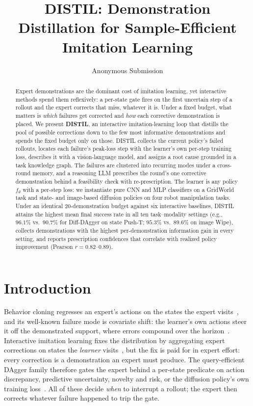 \documentclass[letterpaper]{article} %
\title{DISTIL: Demonstration Distillation for Sample-Efficient Imitation Learning}
\author{
    Anonymous Submission
}
\begin{document}
\maketitle

\begin{abstract}
Expert demonstrations are the dominant cost of imitation learning, yet
interactive methods spend them reflexively: a per-state gate fires on the first
uncertain step of a rollout and the expert corrects that miss, whatever it is.
Under a fixed budget, what matters is \emph{which} failures get corrected and
\emph{how} each corrective demonstration is placed.
We present \textbf{DISTIL}, an interactive imitation-learning loop that
distills the pool of possible corrections down to the few most informative
demonstrations and spends the fixed budget only on those.
DISTIL collects the current policy's failed rollouts, locates each failure's
peak-loss step with the learner's own per-step training loss, describes it
with a vision-language model, and assigns a root cause grounded in a task
knowledge graph. The failures are clustered into recurring modes under a
cross-round memory, and a reasoning LLM prescribes the round's one
corrective demonstration behind a feasibility check with re-prescription.
The learner is any policy
$f_\theta$ with a per-step loss: we instantiate pure CNN and MLP classifiers on
a GridWorld task and state- and image-based diffusion policies on four robot
manipulation tasks. Under an identical 20-demonstration budget against six
interactive baselines, DISTIL attains the highest mean final success rate in
all ten task--modality settings (e.g., $96.1\%$ vs.\ $90.7\%$ for Diff-DAgger on
state Push-T; $95.3\%$ vs.\ $89.6\%$ on image Wipe), collects demonstrations
with the highest per-demonstration information gain in every setting, and
reports prescription confidences that correlate with realized policy
improvement (Pearson $r=0.82$--$0.89$).
\end{abstract}

\section{Introduction}

Behavior cloning regresses an expert's actions on the states the expert
visits~\citep{pomerleau1988alvinn}, and its well-known
failure mode is covariate shift: the learner's own actions steer it off the
demonstrated support, where errors compound over the
horizon~\citep{ross2011dagger}. Interactive imitation learning fixes the
distribution by aggregating expert corrections on states the \emph{learner}
visits~\citep{ross2011dagger,celemin2022iil}, but the fix is paid for in
expert effort: every correction is a demonstration an expert must produce.
The query-efficient DAgger family therefore gates the expert behind a
per-state predicate on action discrepancy, predictive uncertainty, novelty
and risk, or the diffusion policy's own training
loss~\citep{zhang2017safedagger,menda2017dropoutdagger,menda2019ensembledagger,hoque2021thriftydagger,lee2025diffdagger}.
All of these decide \emph{when} to interrupt a rollout; the expert then
corrects whatever failure happened to trip the gate.
\end{document}
